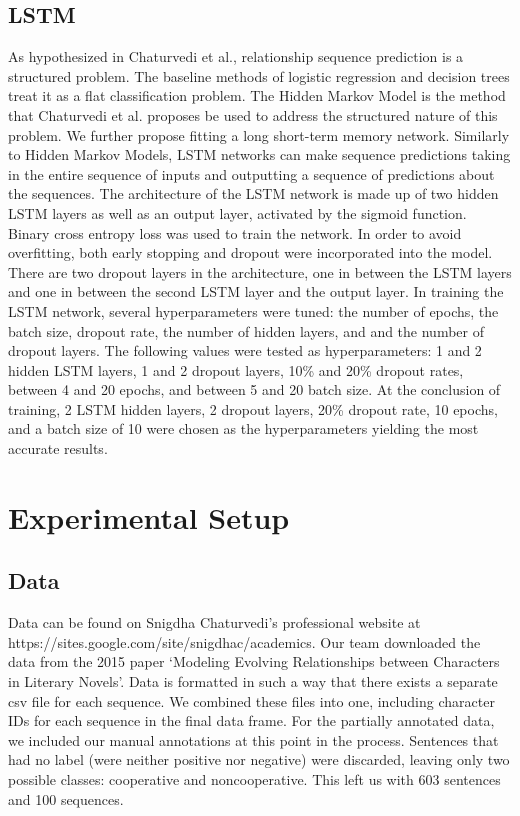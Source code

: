 \documentclass[11pt,a4paper]{article}
\begin{document}
\subsection{LSTM}
As hypothesized in Chaturvedi et al., relationship sequence prediction is a structured problem. The baseline methods of logistic regression and decision trees treat it as a flat classification problem. The Hidden Markov Model is the method that Chaturvedi et al. proposes be used to address the structured nature of this problem. We further propose fitting a long short-term memory network. Similarly to Hidden Markov Models, LSTM networks can make sequence predictions taking in the entire sequence of inputs and outputting a sequence of predictions about the sequences. 
The architecture of the LSTM network is made up of two hidden LSTM layers as well as an output layer, activated by the sigmoid function. Binary cross entropy loss was used to train the network. In order to avoid overfitting, both early stopping and dropout were incorporated into the model. There are two dropout layers in the architecture, one in between the LSTM layers and one in between the second LSTM layer and the output layer.
In training the LSTM network, several hyperparameters were tuned: the number of epochs, the batch size, dropout rate, the number of hidden layers, and and the number of dropout layers. The following values were tested as hyperparameters: 1 and 2 hidden LSTM layers, 1 and 2 dropout layers, 10\% and 20\% dropout rates, between 4 and 20 epochs, and between 5 and 20 batch size. At the conclusion of training, 2 LSTM hidden layers, 2 dropout layers, 20\% dropout rate, 10 epochs, and a batch size of 10 were chosen as the hyperparameters yielding the most accurate results.

\section{Experimental Setup}

\subsection{Data}
Data can be found on Snigdha Chaturvedi’s professional website at https://sites.google.com/site/snigdhac/academics. Our team downloaded the data from the 2015 paper ‘Modeling Evolving Relationships between Characters in Literary Novels’. Data is formatted in such a way that there exists a separate csv file for each sequence. We combined these files into one, including character IDs for each sequence in the final data frame. For the partially annotated data, we included our manual annotations at this point in the process. Sentences that had no label (were neither positive nor negative) were discarded, leaving only two possible classes: cooperative and noncooperative. This left us with 603 sentences and 100 sequences. 
\end{document}
